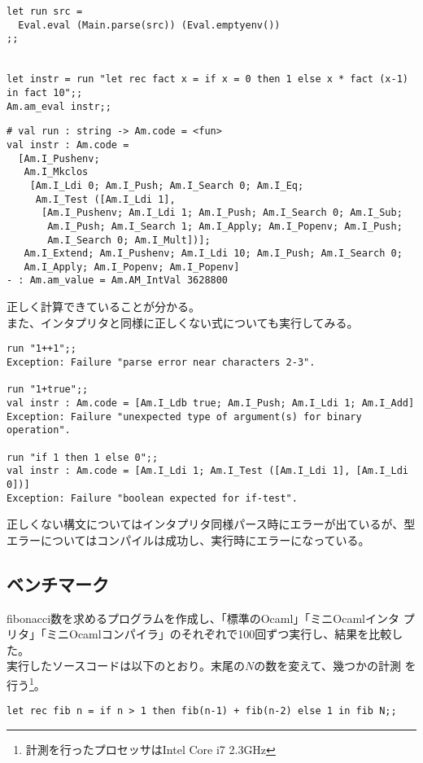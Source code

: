 \documentclass[a4paper,9pt]{jsarticle}
\begin{document}
\begin{lstlisting}
let run src =
  Eval.eval (Main.parse(src)) (Eval.emptyenv())
;;


let instr = run "let rec fact x = if x = 0 then 1 else x * fact (x-1) in fact 10";;
Am.am_eval instr;; 
\end{lstlisting}

\begin{lstlisting}
# val run : string -> Am.code = <fun>
val instr : Am.code =
  [Am.I_Pushenv;
   Am.I_Mkclos
    [Am.I_Ldi 0; Am.I_Push; Am.I_Search 0; Am.I_Eq;
     Am.I_Test ([Am.I_Ldi 1],
      [Am.I_Pushenv; Am.I_Ldi 1; Am.I_Push; Am.I_Search 0; Am.I_Sub;
       Am.I_Push; Am.I_Search 1; Am.I_Apply; Am.I_Popenv; Am.I_Push;
       Am.I_Search 0; Am.I_Mult])];
   Am.I_Extend; Am.I_Pushenv; Am.I_Ldi 10; Am.I_Push; Am.I_Search 0;
   Am.I_Apply; Am.I_Popenv; Am.I_Popenv]
- : Am.am_value = Am.AM_IntVal 3628800
\end{lstlisting}

正しく計算できていることが分かる。\\

また、インタプリタと同様に正しくない式についても実行してみる。

\begin{lstlisting}
run "1++1";;
Exception: Failure "parse error near characters 2-3".

run "1+true";;
val instr : Am.code = [Am.I_Ldb true; Am.I_Push; Am.I_Ldi 1; Am.I_Add]
Exception: Failure "unexpected type of argument(s) for binary operation".

run "if 1 then 1 else 0";;
val instr : Am.code = [Am.I_Ldi 1; Am.I_Test ([Am.I_Ldi 1], [Am.I_Ldi 0])]
Exception: Failure "boolean expected for if-test".
\end{lstlisting}

正しくない構文についてはインタプリタ同様パース時にエラーが出ているが、型
エラーについてはコンパイルは成功し、実行時にエラーになっている。


\subsection{ベンチマーク}
fibonacci数を求めるプログラムを作成し、「標準のOcaml」「ミニOcamlインタ
プリタ」「ミニOcamlコンパイラ」のそれぞれで100回ずつ実行し、結果を比較した。\\

実行したソースコードは以下のとおり。末尾の$N$の数を変えて、幾つかの計測
を行う\footnote{計測を行ったプロセッサはIntel Core i7 2.3GHz}。
\begin{lstlisting}
let rec fib n = if n > 1 then fib(n-1) + fib(n-2) else 1 in fib N;;
\end{lstlisting}
\end{document}
